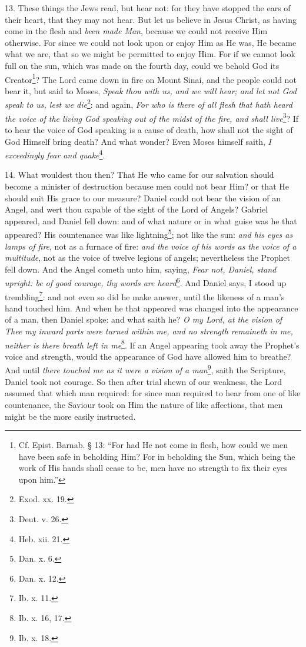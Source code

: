 13. These things the Jews read, but hear not: for they have stopped the ears of their heart, that they may not hear. But let us believe in Jesus Christ, as having come in the flesh and \emph{been made Man}, because we could not receive Him otherwise. For since we could not look upon or enjoy Him as He was, He became what we are, that so we might be permitted to enjoy Him. For if we cannot look full on the sun, which was made on the fourth day, could we behold God its Creator\footnote{Cf. Epist. Barnab. § 13: “For had He not come in flesh, how could we men have been safe in beholding Him? For in beholding the Sun, which being the work of His hands shall cease to be, men have no strength to fix their eyes upon him.”}? The Lord came down in fire on Mount Sinai, and the people could not bear it, but said to Moses, \emph{Speak thou with us, and we will hear; and let not God speak to us, lest we die}\footnote{Exod. xx. 19.}: and again, \emph{For who is there of all flesh that hath heard the voice of the living God speaking out of the midst of the fire, and shall live}\footnote{Deut. v. 26.}? If to hear the voice of God speaking is a cause of death, how shall not the sight of God Himself bring death? And what wonder? Even Moses himself saith, \emph{I exceedingly fear and quake}\footnote{Heb. xii. 21.}.

14. What wouldest thou then? That He who came for our salvation should become a minister of destruction because men could not bear Him? or that He should suit His grace to our measure? Daniel could not bear the vision of an Angel, and wert thou capable of the sight of the Lord of Angels? Gabriel appeared, and Daniel fell down: and of what nature or in what guise was he that appeared? His countenance was like lightning\footnote{Dan. x. 6.}; not like the sun: \emph{and his eyes as lamps of fire}, not as a furnace of fire: \emph{and the voice of his words as the voice of a multitude}, not as the voice of twelve legions of angels; nevertheless the Prophet fell down. And the Angel cometh unto him, saying, \emph{Fear not, Daniel, stand upright: be of good courage, thy words are heard}\footnote{Dan. x. 12.}. And Daniel says, I stood up trembling\footnote{Ib. x. 11.}: and not even so did he make answer, until the likeness of a man’s hand touched him. And when he that appeared was changed into the appearance of a man, then Daniel spoke: and what saith he? \emph{O my Lord, at the vision of Thee my inward parts were turned within me, and no strength remaineth in me, neither is there breath left in me}\footnote{Ib. x. 16, 17.}. If an Angel appearing took away the Prophet’s voice and strength, would the appearance of God have allowed him to breathe? And until \emph{there touched me as it were a vision of a man}\footnote{Ib. x. 18.}, saith the Scripture, Daniel took not courage. So then after trial shewn of our weakness, the Lord assumed that which man required: for since man required to hear from one of like countenance, the Saviour took on Him the nature of like affections, that men might be the more easily instructed.

